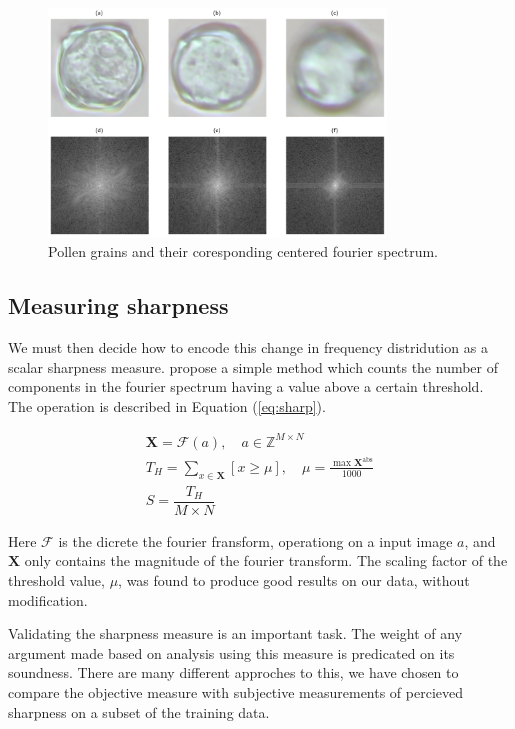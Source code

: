 \begin{figure}[htbp]
  \centering
  \includegraphics[width=0.8\textwidth]{figs/fourier.png}
  \caption[Fourier spectrum]{Pollen grains and their coresponding centered fourier spectrum.}\label{fig:fourier}
\end{figure}

\subsection{Measuring sharpness}
We must then decide how to encode this change in frequency distridution as a scalar sharpness measure.
\citeauthor{de2013image} propose a simple method which counts the number of components in the fourier spectrum having a value above a certain threshold.
The operation is described in Equation (\ref{eq:sharp}).


\begin{equation}\label{eq:sharp}
  \begin{split}
    \mathbf{X} = \mathcal{F}(a),\quad a\in \mathbb{Z}^{M\times N}\\
    T_H = \sum_{x\in\mathbf{X}}[x\ge\mu],\quad \mu=\frac{\max \mathbf{X^{\mathrm{abs}}}}{1000}\\
    S = \dfrac{T_H}{M\times N}
  \end{split}
\end{equation}

Here \(\mathcal{F}\) is the dicrete the fourier fransform, operationg on a input image \(a\), and \(\mathbf{X}\) only contains the magnitude of the fourier transform.
The scaling factor of the threshold value, \(\mu \), was found to produce good results on our data, without modification.

Validating the sharpness measure is an important task.
The weight of any argument made based on analysis using this measure is predicated on its soundness.
There are many different approches to this, we have chosen to compare the objective measure with subjective measurements of percieved sharpness on a subset of the training data.

